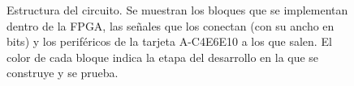 \begin{figure}[t]
  \centering
  \resizebox{\textwidth}{!}{}
  \caption{Estructura del circuito. Se muestran los bloques que se implementan
  dentro de la FPGA, las señales que los conectan (con su ancho en bits) y los
  periféricos de la tarjeta A-C4E6E10 a los que salen. El color de cada bloque
  indica la etapa del desarrollo en la que se construye y se prueba.}
  \label{fig:estructura}
\end{figure}
